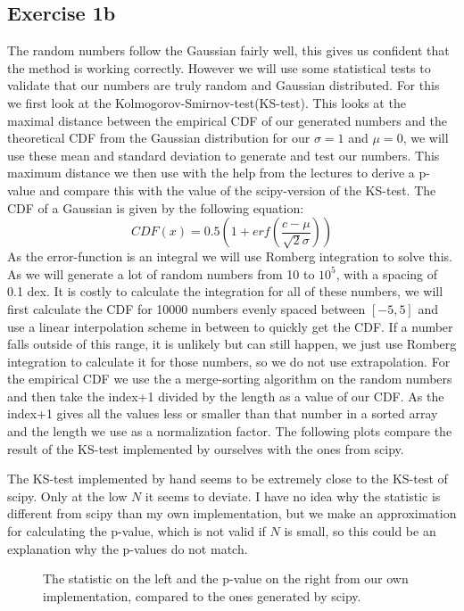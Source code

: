   \subsection{Exercise 1b}
  The random numbers follow the Gaussian fairly well, this gives us confident that the method is working correctly. However we will use some statistical tests to validate that our numbers are truly random and Gaussian distributed. For this we first look at the Kolmogorov-Smirnov-test(KS-test).
  This looks at the maximal distance between the empirical CDF of our generated numbers and the theoretical CDF from the Gaussian distribution for our $\sigma=1$ and $\mu=0$, we will use these mean and standard deviation to generate and test our numbers. This maximum distance we then use with the help from the lectures to derive a p-value and compare this with the value of the scipy-version of the KS-test. The CDF of a Gaussian is given by the following equation:
  \begin{equation}
      CDF(x)=0.5\left(1+erf(\frac{c-\mu}{\sqrt{2}\sigma})\right)
  \end{equation}
  As the error-function is an integral we will use Romberg integration to solve this. As we will generate a lot of random numbers from 10 to $10^5$, with a spacing of 0.1 dex. It is costly to calculate the integration for all of these numbers, we will first calculate the CDF for 10000 numbers evenly spaced between $[-5,5]$ and use a linear interpolation scheme in between to quickly get the CDF. If a number falls outside of this range, it is unlikely but can still happen, we just use Romberg integration to calculate it for those numbers, so we do not use extrapolation. For the empirical CDF we use the a merge-sorting algorithm on the random numbers and then take the index+1 divided by the length as a value of our CDF. As the index+1 gives all the values less or smaller than that number in a sorted array and the length we use as a normalization factor.
 The following plots compare the result of the KS-test implemented by ourselves with the ones from scipy.  
 
 
 
 The KS-test implemented by hand seems to be extremely close to the KS-test of scipy. Only at the low $N$ it seems to deviate. I have no idea why the statistic is different from scipy than my own implementation, but we make an approximation for calculating the p-value, which is not valid if $N$ is small, so this could be an explanation why the p-values do not match.

  \begin{figure} %
	\centering
    \qquad
  \caption{The statistic on the left and the p-value on the right from our own implementation, compared to the ones generated by scipy.}
\end{figure}

